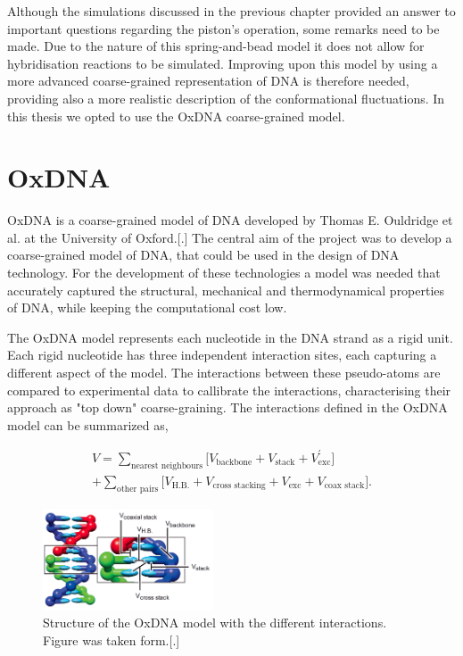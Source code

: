 \vspace{1cm}
Although the simulations discussed in the previous chapter provided an answer to
important questions regarding the piston's operation, some remarks need to be made. Due
to the nature of this spring-and-bead model it does not allow for hybridisation reactions
to be simulated. Improving upon this model by using a more advanced coarse-grained
representation of DNA is therefore needed, providing also a more realistic description of
the conformational fluctuations. In this thesis we opted to use the OxDNA coarse-grained
model.\\


\section{OxDNA}


OxDNA is a coarse-grained model of DNA developed by Thomas E. Ouldridge et al. at the
University of Oxford.[.] The central aim of the project was to develop a coarse-grained
model of DNA, that could be used in the design of DNA technology. For the development of
these technologies a model was needed that accurately captured the structural, mechanical
and thermodynamical properties of DNA, while keeping the computational cost low.

The OxDNA model represents each nucleotide in the DNA strand as a rigid unit. Each rigid
nucleotide has three independent interaction sites, each capturing a different aspect of
the model. The interactions between these pseudo-atoms are compared to experimental
data to callibrate the interactions, characterising their approach as "top down"
coarse-graining. The interactions defined in the OxDNA model can be summarized as,

\begin{equation}
  \begin{aligned}
    V = \sum_{\text{nearest neighbours}} \bigg[ V_{\text{backbone}} + V_{\text{stack}} +
    V^{'}_{\text{exc}}\bigg]\\
    + \sum_{\text{other pairs}} \bigg[V_{\text{H.B.}} + V_{\text{cross stacking}} +
    V_{\text{exc}} + V_{\text{coax stack}}\bigg].
  \end{aligned}
\end{equation}

\begin{figure}
  \begin{center}
    \includegraphics[width=0.45\textwidth]{Figures/oxDNA_model.png}
  \end{center}
  \caption{Structure of the OxDNA model with the different interactions.
  Figure was taken form.[.]}
\end{figure}

